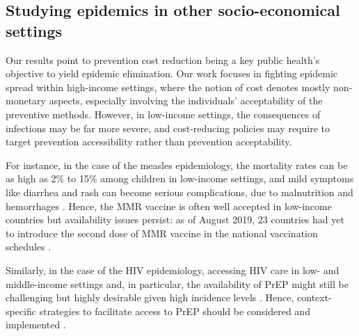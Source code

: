 

\subsection{Studying epidemics in other socio-economical settings}
Our results point to prevention cost reduction being a key public health's objective to yield epidemic elimination. Our work focuses in fighting epidemic spread within high-income settings, where the notion of cost denotes mostly non-monetary aspects, especially involving the individuals' acceptability of the preventive methods. However, in low-income settings, the consequences of infections may be far more severe, and cost-reducing policies may require to target prevention accessibility rather than prevention acceptability. 

For instance, in the case of the measles epidemiology, the mortality rates can be as high as 2\% to 15\% among children in low-income settings, and mild symptoms like diarrhea and rash can become serious complications, due to malnutrition and hemorrhages \cite[]{Sever2011}. Hence, the MMR vaccine is often well accepted in low-income countries \cite[]{Larson2016} but availability issues persist: as of August 2019, 23 countries had yet to introduce the second dose of MMR vaccine in the national vaccination schedules \cite[]{WHO_MeaslesWW2019}. 

Similarly, in the case of the HIV epidemiology, accessing HIV care in low- and middle-income settings and, in particular, the availability of PrEP might still be challenging but highly desirable given high incidence levels \cite[]{UNAIDS_Data2019}. Hence, context-specific strategies to facilitate access to PrEP should be considered and implemented \cite[]{Rebe2019}. 

